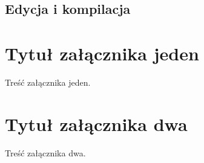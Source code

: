 \documentclass[brudnopis]{xmgr}
\begin{document}
\section{Edycja i kompilacja}

\appendix
\chapter{Tytuł załącznika jeden}

Treść załącznika jeden.

\chapter{Tytuł załącznika dwa}

Treść załącznika dwa.




\listoftables

\listoffigures

\oswiadczenie
\end{document}
